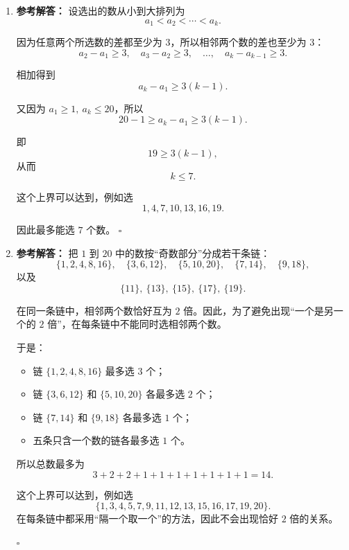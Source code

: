\documentclass[11pt,a4paper,fontset=fandol]{ctexart}
\newenvironment{solution}{\par\noindent\textbf{参考解答：}}{\hfill$\square$\par}
\begin{document}
\begin{enumerate}
\begin{solution}
  相加得到
  \[
  a_5-a_1\ge 12.
  \]

  但所有数都在 $1$ 到 $9$ 之间，所以
  \[
  a_5-a_1\le 8.
  \]

  矛盾。

  因此原假设不成立，必定有两个数的差不超过 $2$。
  \end{solution}

  \item \begin{solution}
  设选出的数从小到大排列为
  \[
  a_1<a_2<\cdots<a_k.
  \]

  因为任意两个所选数的差都至少为 $3$，所以相邻两个数的差也至少为 $3$：
  \[
  a_2-a_1\ge 3,\quad a_3-a_2\ge 3,\quad \ldots,\quad a_k-a_{k-1}\ge 3.
  \]

  相加得到
  \[
  a_k-a_1\ge 3(k-1).
  \]

  又因为 $a_1\ge 1,\ a_k\le 20$，所以
  \[
  20-1\ge a_k-a_1\ge 3(k-1).
  \]

  即
  \[
  19\ge 3(k-1),
  \]
  从而
  \[
  k\le 7.
  \]

  这个上界可以达到，例如选
  \[
  1,4,7,10,13,16,19.
  \]

  因此最多能选 $7$ 个数。
  \end{solution}

  \item \begin{solution}
  把 $1$ 到 $20$ 中的数按“奇数部分”分成若干条链：
  \[
  \{1,2,4,8,16\},\quad \{3,6,12\},\quad \{5,10,20\},\quad \{7,14\},\quad \{9,18\},
  \]
  以及
  \[
  \{11\},\ \{13\},\ \{15\},\ \{17\},\ \{19\}.
  \]

  在同一条链中，相邻两个数恰好互为 $2$ 倍。因此，为了避免出现“一个是另一个的 $2$ 倍”，在每条链中不能同时选相邻两个数。

  于是：
  \begin{itemize}
    \item 链 $\{1,2,4,8,16\}$ 最多选 $3$ 个；
    \item 链 $\{3,6,12\}$ 和 $\{5,10,20\}$ 各最多选 $2$ 个；
    \item 链 $\{7,14\}$ 和 $\{9,18\}$ 各最多选 $1$ 个；
    \item 五条只含一个数的链各最多选 $1$ 个。
  \end{itemize}

  所以总数最多为
  \[
  3+2+2+1+1+1+1+1+1+1=14.
  \]

  这个上界可以达到，例如选
  \[
  \{1,3,4,5,7,9,11,12,13,15,16,17,19,20\}.
  \]
  在每条链中都采用“隔一个取一个”的方法，因此不会出现恰好 $2$ 倍的关系。


\end{solution}
\end{enumerate}
\end{document}
